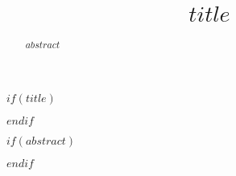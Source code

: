 $if(title)$
\title{$title$}
$endif$

$if(abstract)$
\begin{abstract}
$abstract$
\end{abstract}
$endif$